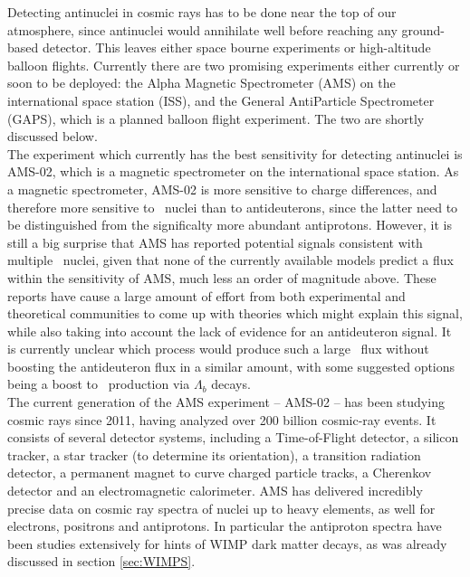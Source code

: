 Detecting antinuclei in cosmic rays has to be done near the top of our atmosphere, since antinuclei would annihilate well before reaching any ground-based detector. This leaves either space bourne experiments or high-altitude balloon flights. Currently there are two promising experiments either currently or soon to be deployed: the Alpha Magnetic Spectrometer (AMS)\cite{} on the international space station (ISS), and the General AntiParticle Spectrometer (GAPS)\cite{}, which is a planned balloon flight experiment. The two are shortly discussed below.\\

The experiment which currently has the best sensitivity for detecting antinuclei is AMS-02, which is a magnetic spectrometer on the international space station. As a magnetic spectrometer, AMS-02 is more sensitive to charge differences, and therefore more sensitive to \ahe\ nuclei than to antideuterons, since the latter need to be distinguished from the significalty more abundant antiprotons. However, it is still a big surprise that AMS has reported potential signals consistent with multiple \ahe\ nuclei, given that none of the currently available models predict a flux within the sensitivity of AMS, much less an order of magnitude above. These reports have cause a large amount of effort from both experimental and theoretical communities to come up with theories which might explain this signal, while also taking into account the lack of evidence for an antideuteron signal. It is currently unclear which process would produce such a large \ahe\ flux without boosting the antideuteron flux in a similar amount, with some suggested options being a boost to \ahe\ production via $\Lambda_b$ decays\cite{}. \\
The current generation of the AMS experiment -- AMS-02 -- has been studying cosmic rays since 2011, having analyzed over 200 billion cosmic-ray events. It consists of several detector systems, including a Time-of-Flight detector, a silicon tracker, a star tracker (to determine its orientation), a transition radiation detector, a permanent magnet to curve charged particle tracks, a Cherenkov detector and an electromagnetic calorimeter. AMS has delivered incredibly precise data on cosmic ray spectra of nuclei up to heavy elements, as well for electrons, positrons and antiprotons. In particular the antiproton spectra have been studies extensively for hints of WIMP dark matter decays, as was already discussed in section \ref{sec:WIMPS}. \\
